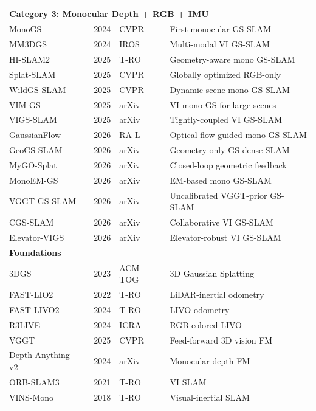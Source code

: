 \begin{table}[h]
\begin{tabular}{p{4cm}p{2cm}p{2cm}p{5cm}}
\midrule
\multicolumn{4}{l}{\textbf{Category 3: Monocular Depth + RGB + IMU}} \\
\midrule
MonoGS~\cite{matsuki2024monogs} & 2024 & CVPR & First monocular GS-SLAM \\
MM3DGS~\cite{sun2024_mm3dgs} & 2024 & IROS & Multi-modal VI GS-SLAM \\
HI-SLAM2~\cite{zhang2026_hislam2} & 2025 & T-RO & Geometry-aware mono GS-SLAM \\
Splat-SLAM~\cite{sandstrom2025_splatslam} & 2025 & CVPR & Globally optimized RGB-only \\
WildGS-SLAM~\cite{zheng2025_wildgssslam} & 2025 & CVPR & Dynamic-scene mono GS-SLAM \\
VIM-GS~\cite{zhang2026_vimgs} & 2025 & arXiv & VI mono GS for large scenes \\
VIGS-SLAM~\cite{zhu2026_vigssslam} & 2025 & arXiv & Tightly-coupled VI GS-SLAM \\
GaussianFlow~\cite{seo2026_gaussianflow} & 2026 & RA-L & Optical-flow-guided mono GS-SLAM \\
GeoGS-SLAM~\cite{zhou2026_geogs} & 2026 & arXiv & Geometry-only GS dense SLAM \\
MyGO-Splat~\cite{zhu2026_mygosplat} & 2026 & arXiv & Closed-loop geometric feedback \\
MonoEM-GS~\cite{kruzhkov2026_monoemgs} & 2026 & arXiv & EM-based mono GS-SLAM \\
VGGT-GS SLAM~\cite{han2026_vggtgssslam} & 2026 & arXiv & Uncalibrated VGGT-prior GS-SLAM \\
CGS-SLAM~\cite{deambrogi2026_cgssslam} & 2026 & arXiv & Collaborative VI GS-SLAM \\
Elevator-VIGS~\cite{zhou2026_elevatorvigs} & 2026 & arXiv & Elevator-robust VI GS-SLAM \\
\midrule
\multicolumn{4}{l}{\textbf{Foundations}} \\
\midrule
3DGS~\cite{kerbl2023_3dgs} & 2023 & ACM TOG & 3D Gaussian Splatting \\
FAST-LIO2~\cite{xu2022fastlio2} & 2022 & T-RO & LiDAR-inertial odometry \\
FAST-LIVO2~\cite{zheng2024_fastlivo2} & 2024 & T-RO & LIVO odometry \\
R3LIVE~\cite{lin2024_r3live} & 2024 & ICRA & RGB-colored LIVO \\
VGGT~\cite{wang2025_vggt} & 2025 & CVPR & Feed-forward 3D vision FM \\
Depth Anything v2~\cite{yang2024depthanythingv2} & 2024 & arXiv & Monocular depth FM \\
ORB-SLAM3~\cite{campos2021orbslam3} & 2021 & T-RO & VI SLAM \\
VINS-Mono~\cite{qin2018vinsmono} & 2018 & T-RO & Visual-inertial SLAM \\
\bottomrule
\end{tabular}
\end{table}
